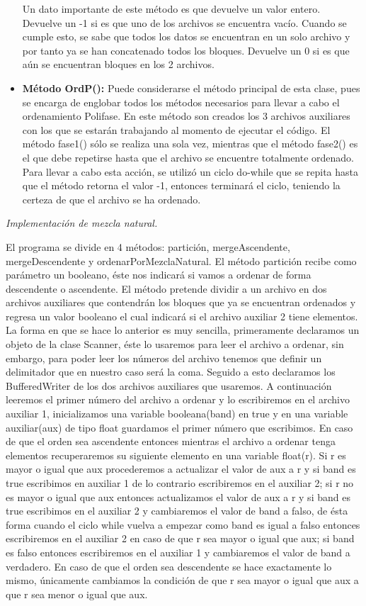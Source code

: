 \documentclass[12pt,letterpaper]{article}
\begin{document}
\begin{large}
\begin{itemize}[noitemsep,topsep=0pt]
Un dato importante de este método es que devuelve un valor entero. Devuelve un -1 si es que uno de los archivos se encuentra vacío. Cuando se cumple esto, se sabe que todos los datos se encuentran en un solo archivo y por tanto ya se han concatenado todos los bloques. Devuelve un 0 si es que aún se encuentran bloques en los 2 archivos.
\item\textbf{Método OrdP():} Puede considerarse el método principal de esta clase, pues se encarga de englobar todos los métodos necesarios para llevar a cabo el ordenamiento Polifase.
En este método son creados los 3 archivos auxiliares con los que se estarán trabajando al momento de ejecutar el código.
El método fase1() sólo se realiza una sola vez, mientras que el método fase2() es el que debe repetirse hasta que el archivo se encuentre totalmente ordenado. Para llevar a cabo esta acción, se utilizó un ciclo do-while que se repita hasta que el método retorna el valor -1, entonces terminará el ciclo, teniendo la certeza de que el archivo se ha ordenado.
\end{itemize}
\vspace{0.2cm}
\noindent\textit{Implementación de mezcla natural.}\par
El programa se divide en 4 métodos: partición, mergeAscendente, mergeDescendente y ordenarPorMezclaNatural.
El método partición recibe como parámetro un booleano, éste nos indicará si vamos a ordenar de forma descendente o ascendente. 
El método pretende dividir a un archivo en dos archivos auxiliares que contendrán los bloques que ya se encuentran ordenados y regresa un valor booleano el cual indicará si el archivo auxiliar 2 tiene elementos. 
La forma en que se hace lo anterior es muy sencilla, primeramente declaramos un objeto de la clase Scanner, éste lo usaremos para leer el archivo a ordenar, sin embargo, para poder leer los números del archivo tenemos que definir un delimitador que en nuestro caso será la coma. Seguido a esto declaramos los BufferedWriter de los dos archivos auxiliares que usaremos. A continuación leeremos el primer número del archivo a ordenar y lo escribiremos en el archivo auxiliar 1, inicializamos una variable booleana(band) en true y en una variable auxiliar(aux) de tipo float guardamos el primer número que escribimos. En caso de que el orden sea ascendente entonces mientras el archivo a ordenar tenga elementos recuperaremos su siguiente elemento en una variable float(r). Si r es mayor o igual que aux procederemos a actualizar el valor de aux a r y si band es true escribimos en auxiliar 1 de lo contrario escribiremos en el auxiliar 2; si r no es mayor o igual que aux entonces actualizamos el valor de aux a r y si band es true escribimos en el auxiliar 2 y cambiaremos el valor de band a falso, de ésta forma cuando el ciclo while vuelva a empezar como band es igual a falso entonces escribiremos en el auxiliar 2 en caso de que r sea mayor o igual que aux; si band es falso entonces escribiremos en el auxiliar 1 y cambiaremos el valor de band a verdadero. En caso de que el orden sea descendente se hace exactamente lo mismo, únicamente cambiamos la condición de que r sea mayor o igual que aux a que r sea menor o igual que aux.

\end{large}
\end{document}

